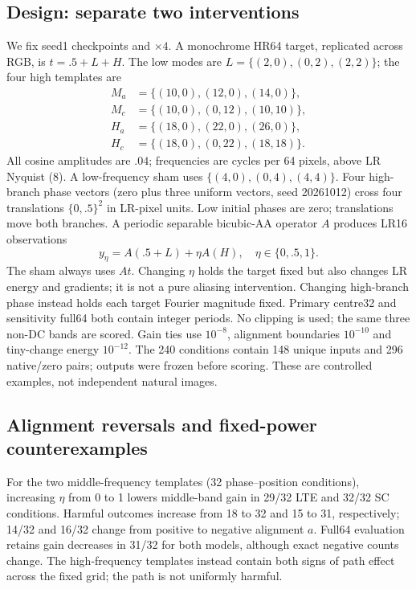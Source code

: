 \subsection{Design: separate two interventions}
We fix seed1 checkpoints and $\times4$. A monochrome HR64 target,
replicated across RGB, is $t=.5+L+H$. The low modes are
$L=\{(2,0),(0,2),(2,2)\}$; the four high templates are
\begin{align*}
 M_a&=\{(10,0),(12,0),(14,0)\},\\
 M_c&=\{(10,0),(0,12),(10,10)\},\\
 H_a&=\{(18,0),(22,0),(26,0)\},\\
 H_c&=\{(18,0),(0,22),(18,18)\}.
\end{align*}
All cosine amplitudes are $.04$; frequencies are cycles per 64 pixels,
above LR Nyquist (8). A low-frequency sham uses
$\{(4,0),(0,4),(4,4)\}$. Four high-branch phase vectors (zero plus three
uniform vectors, seed 20261012) cross four translations
$\{0,.5\}^2$ in LR-pixel units. Low initial phases are zero; translations
move both branches. A periodic separable bicubic-AA operator $A$ produces
LR16 observations
\begin{equation}
 y_\eta=A(.5+L)+\eta A(H),\quad\eta\in\{0,.5,1\}.
 \label{eq:path}
\end{equation}
The sham always uses $At$. Changing $\eta$ holds the target fixed but also
changes LR energy and gradients; it is not a pure aliasing intervention.
Changing high-branch phase instead holds each target Fourier magnitude
fixed. Primary centre32 and sensitivity full64 both contain integer
periods. No clipping is used; the same three non-DC bands are scored.
Gain ties use $10^{-8}$, alignment boundaries $10^{-10}$ and tiny-change
energy $10^{-12}$. The 240 conditions contain 148 unique inputs and
296 native/zero pairs; outputs were frozen before scoring. These are
controlled examples, not independent natural images.

\subsection{Alignment reversals and fixed-power counterexamples}
For the two middle-frequency templates (32 phase--position conditions),
increasing $\eta$ from 0 to 1 lowers middle-band gain in 29/32 LTE and
32/32 SC conditions. Harmful outcomes increase from 18 to 32 and 15 to
31, respectively; 14/32 and 16/32 change from positive to negative
alignment $a$. Full64 evaluation retains gain decreases in 31/32 for
both models, although exact negative counts change. The high-frequency
templates instead contain both signs of path effect
across the fixed grid; the path is not uniformly harmful.

